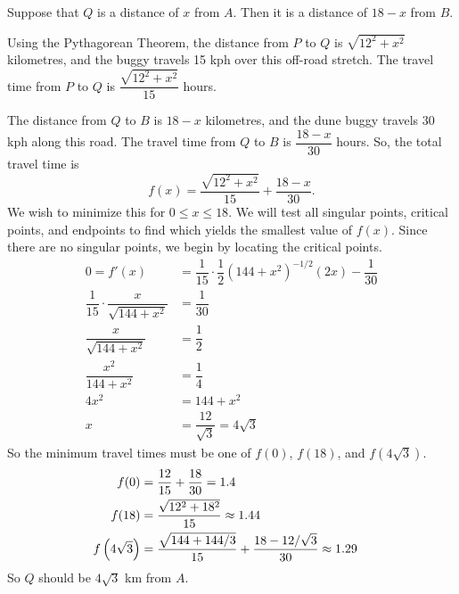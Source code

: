 \begin{solution}
Suppose that $Q$ is a distance of $x$ from $A$.
Then it is a distance of $18-x$ from $B$.
\begin{center}
\end{center}
Using the Pythagorean Theorem, the distance from $P$ to $Q$ is $\sqrt{12^2+x^2}$ kilometres, and the buggy travels 15 kph over this off-road stretch.
The travel time
from $P$ to $Q$ is $\dfrac{\sqrt{12^2+x^2}}{15}$ hours.

The distance from $Q$ to $B$ is $18-x$ kilometres, and the dune buggy travels $30$ kph along this road. The travel time from $Q$
to $B$ is $\dfrac{18-x}{30}$ hours.
So, the total travel time is
\[f(x)= \dfrac{\sqrt{12^2+x^2}}{15}+\dfrac{18-x}{30}.\] We wish to minimize
this for $0\le x\le 18$. We will test all singular points, critical points, and endpoints to find which yields the smallest value of $f(x)$. Since there are no singular points, we begin by locating the critical points.
\begin{align*}
0=f'(x)&=\dfrac{1}{15}\cdot\dfrac{1}{2}(144+x^2)^{-1/2}(2x)-\dfrac{1}{30}\\
\dfrac{1}{15}\cdot\dfrac{x}{\sqrt{144+x^2}}&=\dfrac{1}{30}\\
 \dfrac{x}{\sqrt{144+x^2}}&=\dfrac{1}{2}\\
 \dfrac{x^2}{144+x^2}&=\dfrac{1}{4}\\
 4x^2&=144+x^2\\
 x&=\dfrac{12}{\sqrt{3}}=4\sqrt{3}
\end{align*}
So the minimum travel times must be one of $f(0)$, $f(18)$, and $f\left(4\sqrt{3}\right)$.
\begin{align*}
f(0)&=\dfrac{12}{15}+\dfrac{18}{30}=1.4\cr
f(18)&=\dfrac{\sqrt{12^2+18^2}}{15}\approx1.44\cr
f\left({4\sqrt{3}}\right)&=
\dfrac{\sqrt{144+144/3}}{15}+\dfrac{18-12/\sqrt{3}}{30}
\approx1.29
\end{align*}
So $Q$ should be $4\sqrt{3}$ km from $A$.
\end{solution}

